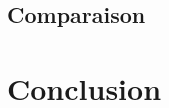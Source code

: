 \documentclass{report}
\begin{document}
     \newpage
     \section{Comparaison}
  \chapter*{Conclusion}
  
\end{document}
